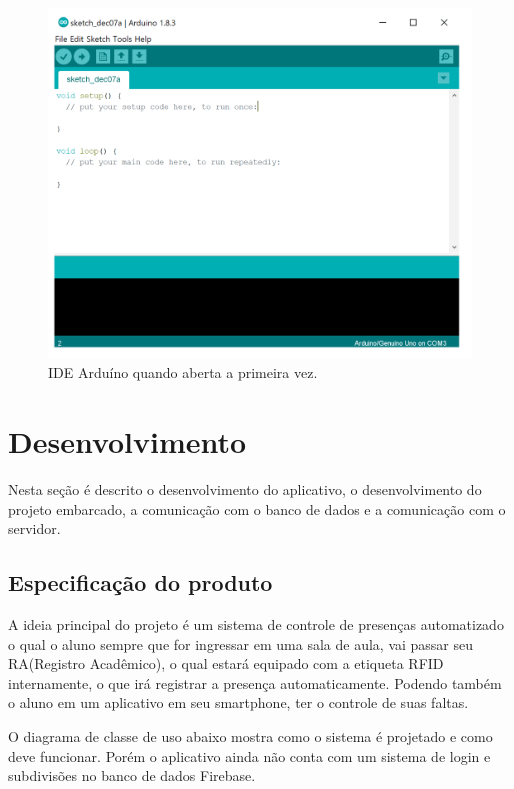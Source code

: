\documentclass[12pt]{article}
\begin{document}
\begin{figure}[H]
\centering
\includegraphics[scale=.30]{arduinoide.png}
\caption{IDE Arduíno quando aberta a primeira vez.}
\end{figure}


\section{Desenvolvimento}
Nesta seção é descrito o desenvolvimento do aplicativo, o desenvolvimento do projeto embarcado, a comunicação com o banco de dados e a comunicação com o servidor.

\subsection{Especificação do produto}
A ideia principal do projeto é um sistema de controle de presenças automatizado o qual o aluno sempre que for ingressar em uma sala de aula, vai passar seu RA(Registro Acadêmico), o qual estará equipado com a etiqueta RFID internamente, o que irá registrar a presença automaticamente. Podendo também o aluno em um aplicativo em seu smartphone, ter o controle de suas faltas.

O diagrama de classe de uso abaixo mostra como o sistema é projetado e como deve funcionar. Porém o aplicativo ainda não conta com um sistema de login e subdivisões no banco de dados Firebase. 
\end{document}

